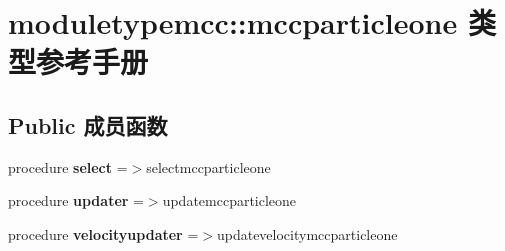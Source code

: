 \hypertarget{structmoduletypemcc_1_1mccparticleone}{}\section{moduletypemcc\+::mccparticleone 类型参考手册}
\label{structmoduletypemcc_1_1mccparticleone}
\subsection*{Public 成员函数}
\begin{DoxyCompactItemize}
\item 
\mbox{\label{structmoduletypemcc_1_1mccparticleone_ad6cd6eb325d96e9cce2a07513b1f644d}} 
procedure {\bfseries select} =$>$selectmccparticleone
\item 
\mbox{\label{structmoduletypemcc_1_1mccparticleone_a99e160a6ea68e0c6c9cf6f41f77f4267}} 
procedure {\bfseries updater} =$>$updatemccparticleone
\item 
\mbox{\label{structmoduletypemcc_1_1mccparticleone_ab74328ee3d4767774d7e42bb4d6781bb}} 
procedure {\bfseries velocityupdater} =$>$updatevelocitymccparticleone
\end{DoxyCompactItemize}
